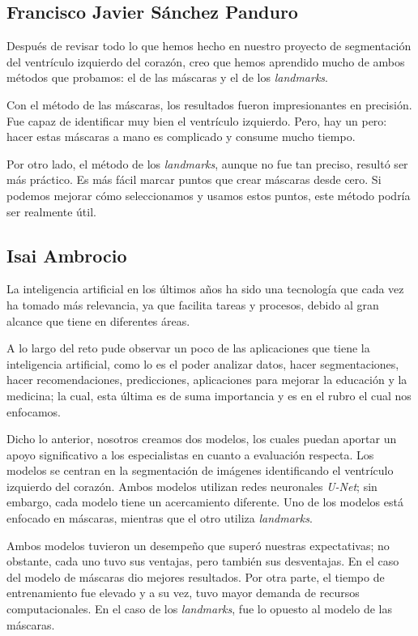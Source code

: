 \documentclass[runningheads]{llncs}
\begin{document}
\subsection{Francisco Javier Sánchez Panduro}
Después de revisar todo lo que hemos hecho en nuestro proyecto de segmentación del ventrículo izquierdo del corazón, creo que hemos aprendido mucho de ambos métodos que probamos: el de las máscaras y el de los \textit{landmarks}.

Con el método de las máscaras, los resultados fueron impresionantes en precisión. Fue capaz de identificar muy bien el ventrículo izquierdo. Pero, hay un pero: hacer estas máscaras a mano es complicado y consume mucho tiempo.

Por otro lado, el método de los \textit{landmarks}, aunque no fue tan preciso, resultó ser más práctico. Es más fácil marcar puntos que crear máscaras desde cero. Si podemos mejorar cómo seleccionamos y usamos estos puntos, este método podría ser realmente útil.

\subsection{Isai Ambrocio}
La inteligencia artificial en los últimos años ha sido una tecnología que cada vez   ha tomado más relevancia, ya que facilita tareas y procesos, debido al gran alcance que tiene en diferentes áreas.

A lo largo del reto pude observar un poco de las aplicaciones que tiene la inteligencia artificial, como lo es el poder analizar datos, hacer segmentaciones, hacer recomendaciones, predicciones, aplicaciones para mejorar la educación y la medicina; la cual, esta última es de suma importancia y es en el rubro el cual nos enfocamos. 

Dicho lo anterior, nosotros creamos dos modelos, los cuales puedan aportar un apoyo significativo a los especialistas en cuanto a evaluación respecta.  Los modelos se centran en la segmentación de imágenes identificando el ventrículo izquierdo del corazón. Ambos modelos utilizan redes neuronales \textit{U-Net}; sin embargo, cada modelo tiene un acercamiento diferente. Uno de los modelos está enfocado en máscaras, mientras que el otro utiliza \textit{landmarks}. 

Ambos modelos tuvieron un desempeño que superó nuestras expectativas; no obstante, cada uno tuvo sus ventajas, pero también sus desventajas. En el caso del modelo de máscaras dio mejores resultados. Por otra parte, el tiempo de entrenamiento fue elevado y a su vez, tuvo mayor demanda de recursos computacionales. En el caso de los \textit{landmarks}, fue lo opuesto al modelo de las máscaras. 
\end{document}
